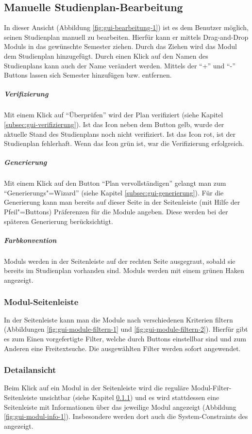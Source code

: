 \subsection{Manuelle Studienplan-Bearbeitung}
\label{subsec:gui-manuelle-bearbeitung}
In dieser Ansicht (Abbildung \ref{fig:gui-bearbeitung-1}) ist es dem \gls{Benutzer} möglich, seinen \gls{Studienplan} manuell zu bearbeiten. Hierfür kann er mittels \gls{Drag-and-Drop} \glspl{Modul}   in das gewünschte Semester ziehen. Durch das Ziehen wird das \gls{Modul} dem \gls{Studienplan} hinzugefügt. Durch einen Klick auf den Namen des \gls{Studienplan}s kann auch der Name verändert werden. Mittels der \enquote{+} und \enquote{-} Buttons lassen sich Semester hinzufügen bzw. entfernen.
\subparagraph{Verifizierung}
Mit einem Klick auf \enquote{Überprüfen} wird der Plan verifiziert (siehe Kapitel \ref{subsec:gui-verifizierung}).\newline
Ist das Icon neben dem Button gelb, wurde der aktuelle Stand des \gls{Studienplan}s noch nicht verifiziert. Ist das Icon rot, ist der \gls{Studienplan} fehlerhaft. Wenn das Icon grün ist, war die Verifizierung erfolgreich.
\subparagraph{Generierung}
Mit einem Klick auf den Button \enquote{Plan vervollständigen} gelangt man zum \enquote{Generierungs"=Wizard} (siehe Kapitel \ref{subsec:gui-generierung}). Für die Generierung kann man bereits auf dieser Seite in der Seitenleiste (mit Hilfe der Pfeil"=Buttons) Präferenzen für die Module angeben. Diese werden bei der späteren Generierung berücksichtigt.
\subparagraph{Farbkonvention}
\glspl{Modul} werden in der Seitenleiste auf der rechten Seite ausgegraut, sobald sie bereits im \gls{Studienplan} vorhanden sind.\newline
{} \glspl{Modul} werden mit einem grünen Haken angezeigt.


\subsubsection{Modul-Seitenleiste}
\label{subsec:gui-modul-sidebar}
In der Seitenleiste kann man die Module nach verschiedenen Kriterien filtern (Abbildungen \ref{fig:gui-module-filtern-1} und \ref{fig:gui-module-filtern-2}). Hierfür gibt es zum Einen vorgefertigte Filter, welche durch Buttons einstellbar sind und zum Anderen eine Freitextsuche. Die ausgewählten Filter werden sofort angewendet.


\subsubsection{Detailansicht}
Beim Klick auf ein Modul in der Seitenleiste wird die reguläre Modul-Filter-Seitenleiste unsichtbar (siehe Kapitel \ref{subsec:gui-modul-sidebar}) und es wird stattdessen eine Seitenleiste mit Informationen über das jeweilige Modul angezeigt (Abbildung \ref{fig:gui-modul-info-1}). Insbesondere werden dort auch die \glspl{System-Constraint} des  angezeigt.



